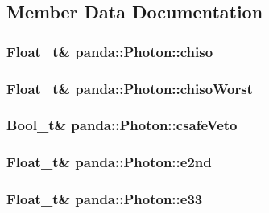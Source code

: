 \subsection{Member Data Documentation}
\hypertarget{classpanda_1_1Photon_acce389c356c5a27d94acce9389fe52c7}{
\subsubsection[{chiso}]{\setlength{\rightskip}{0pt plus 5cm}Float\_\-t\& {\bf panda::Photon::chiso}}}
\label{classpanda_1_1Photon_acce389c356c5a27d94acce9389fe52c7}
\hypertarget{classpanda_1_1Photon_af73244ae1fd6ee690fd1708b93aa2bf4}{
\subsubsection[{chisoWorst}]{\setlength{\rightskip}{0pt plus 5cm}Float\_\-t\& {\bf panda::Photon::chisoWorst}}}
\label{classpanda_1_1Photon_af73244ae1fd6ee690fd1708b93aa2bf4}
\hypertarget{classpanda_1_1Photon_ad1062c22cb21f142b0c17b671e2c775b}{
\subsubsection[{csafeVeto}]{\setlength{\rightskip}{0pt plus 5cm}Bool\_\-t\& {\bf panda::Photon::csafeVeto}}}
\label{classpanda_1_1Photon_ad1062c22cb21f142b0c17b671e2c775b}
\hypertarget{classpanda_1_1Photon_a83e90e21bf396baabd3d4d5fef868df9}{
\subsubsection[{e2nd}]{\setlength{\rightskip}{0pt plus 5cm}Float\_\-t\& {\bf panda::Photon::e2nd}}}
\label{classpanda_1_1Photon_a83e90e21bf396baabd3d4d5fef868df9}
\hypertarget{classpanda_1_1Photon_aa3dbc87388b7b6ec2d291c21055e9590}{
\subsubsection[{e33}]{\setlength{\rightskip}{0pt plus 5cm}Float\_\-t\& {\bf panda::Photon::e33}}}
